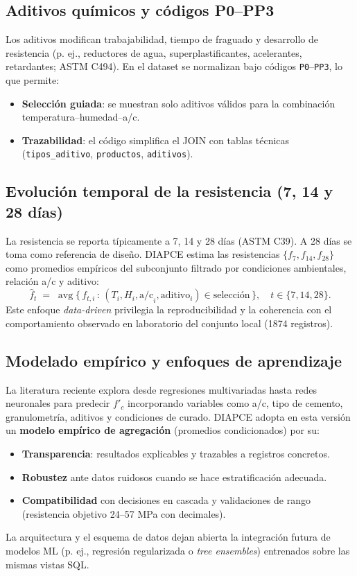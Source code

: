 \documentclass[12pt, letterpaper]{article}
\begin{document}
\subsection{Aditivos químicos y códigos P0–PP3}
Los aditivos modifican trabajabilidad, tiempo de fraguado y desarrollo de resistencia (p. ej., reductores de agua, superplastificantes, acelerantes, retardantes; ASTM C494). En el dataset se normalizan bajo códigos \texttt{P0}–\texttt{PP3}, lo que permite:
\begin{itemize}
    \item \textbf{Selección guiada}: se muestran solo aditivos válidos para la combinación temperatura–humedad–a/c.
    \item \textbf{Trazabilidad}: el código simplifica el JOIN con tablas técnicas (\texttt{tipos\_aditivo}, \texttt{productos}, \texttt{aditivos}).
\end{itemize}

\subsection{Evolución temporal de la resistencia (7, 14 y 28 días)}
La resistencia se reporta típicamente a 7, 14 y 28 días (ASTM C39). A 28 días se toma como referencia de diseño. DIAPCE estima las resistencias $\{f_7, f_{14}, f_{28}\}$ como promedios empíricos del subconjunto filtrado por condiciones ambientales, relación a/c y aditivo:
\[
\hat f_{t} \;=\; \operatorname{avg}\{\, f_{t,i}\,:\, (T_i,H_i,\mathrm{a/c}_i,\mathrm{aditivo}_i)\in \text{selección}\,\},\quad t\in\{7,14,28\}.
\]
Este enfoque \textit{data-driven} privilegia la reproducibilidad y la coherencia con el comportamiento observado en laboratorio del conjunto local (1874 registros).

\subsection{Modelado empírico y enfoques de aprendizaje}
La literatura reciente explora desde regresiones multivariadas hasta redes neuronales para predecir $f'_c$ incorporando variables como a/c, tipo de cemento, granulometría, aditivos y condiciones de curado. DIAPCE adopta en esta versión un \textbf{modelo empírico de agregación} (promedios condicionados) por su:
\begin{itemize}
    \item \textbf{Transparencia}: resultados explicables y trazables a registros concretos.
    \item \textbf{Robustez} ante datos ruidosos cuando se hace estratificación adecuada.
    \item \textbf{Compatibilidad} con decisiones en cascada y validaciones de rango (resistencia objetivo 24–57 MPa con decimales).
\end{itemize}
La arquitectura y el esquema de datos dejan abierta la integración futura de modelos ML (p. ej., regresión regularizada o \textit{tree ensembles}) entrenados sobre las mismas vistas SQL.
\end{document}

